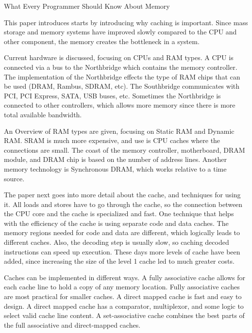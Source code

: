 \documentclass[letterpaper,12pt,titlepage]{article}
\begin{document}
\centerline{\large What Every Programmer Should Know About Memory}

This paper introduces starts by introducing why caching is important.
Since mass storage and memory systems have improved slowly compared to the CPU and other component, the memory creates the bottleneck in a system.
\newline
\par
Current hardware is discussed, focusing on CPUs and RAM types.
A CPU is connected via a bus to the Northbridge which contains the memory controller.
The implementation of the Northbridge effects the type of RAM chips that can be used (DRAM, Rambus, SDRAM, etc).
The Southbridge communicates with PCI, PCI Express, SATA, USB buses, etc.
Sometimes the Northbridge is connected to other controllers, which allows more memory since there is more total available bandwidth.
\newline
\par
An Overview of RAM types are given, focusing on Static RAM and Dynamic RAM.
SRAM is much more expensive, and use is CPU caches where the connections are small.
The coast of the memory controller, motherboard, DRAM module, and DRAM chip is based on the number of address lines.
Another memory technology is Synchronous DRAM, which works relative to a time source.
\newline
\par
The paper next goes into more detail about the cache, and techniques for using it.
All loads and stores have to go through the cache, so the connection between the CPU core and the cache is specialized and fast.
One technique that helps with the efficiency of the cache is using separate code and data caches.
The memory regions needed for code and data are different, which logically leads to different caches.
Also, the decoding step is usually slow, so caching decoded instructions can speed up execution.
These days more levels of cache have been added, since increasing the size of the level 1 cache led to much greater costs.
\newline
\par
Caches can be implemented in different ways.
A fully associative cache allows for each cache line to hold a copy of any memory location.
Fully associative caches are most practical for smaller caches.
A direct mapped cache is fast and easy to design.
A direct mapped cache has a comparator, multiplexor, and some logic to select valid cache line content.
A set-associative cache combines the best parts of the full associative and direct-mapped caches.
\end{document}
